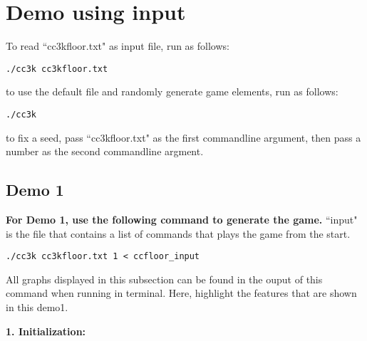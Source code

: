 \documentclass[11pt]{article}
\theoremstyle{plain}
\begin{document}
\newpage
\section{ Demo using input }

To read ``cc3kfloor.txt" as input file, run as follows:
\begin{lstlisting}
./cc3k cc3kfloor.txt
\end{lstlisting}
to use the default file and randomly generate game elements, run as follows:
\begin{lstlisting}
./cc3k
\end{lstlisting}
to fix a seed, pass ``cc3kfloor.txt" as the first commandline argument,
then pass a number as the second commandline argment. 

\subsection{Demo 1}
\textbf{For Demo 1, use the following command to generate the game.} ``input"
is the file that contains a list of commands that plays the game from the
start.
\begin{lstlisting}
./cc3k cc3kfloor.txt 1 < ccfloor_input
\end{lstlisting}
All graphs displayed in this subsection can be found in the ouput of
this command when running in terminal. Here, highlight the features that
are shown in this demo1.

\textbf{1. Initialization:}
\end{document}
